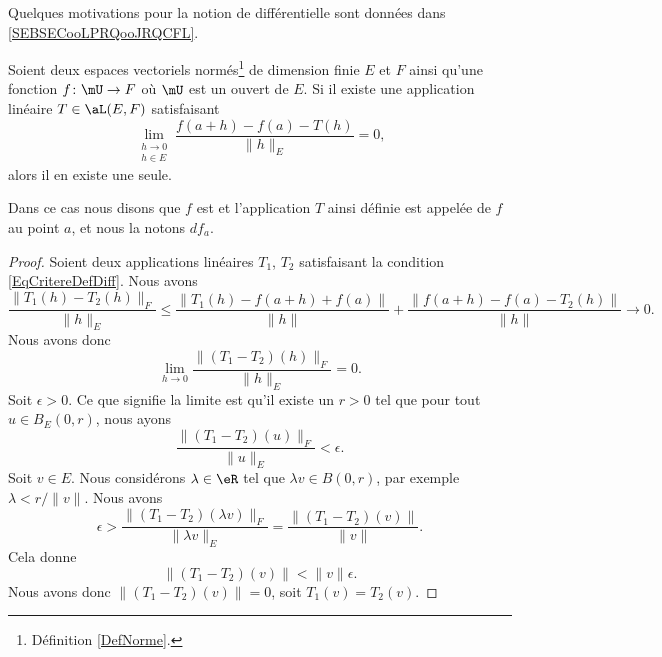 Quelques motivations pour la notion de différentielle sont données dans \ref{SEBSECooLPRQooJRQCFL}.

\begin{propositionDef}      \label{DefDifferentiellePta}
	Soient deux espaces vectoriels normés\footnote{Définition \ref{DefNorme}.} de dimension finie \( E\) et \( F\) ainsi qu'une fonction \( f\colon \mU\to F\) où \( \mU\) est un ouvert de \( E\). Si il existe une application linéaire \( T\in\aL(E,F)\) satisfaisant
	\begin{equation}	\label{EqCritereDefDiff}
		\lim_{\substack{h\to 0\\h\in E}}\frac{f(a+h)-f(a)-T(h)}{\|h\|_E}=0,
	\end{equation}
	alors il en existe une seule.

	Dans ce cas nous disons que \( f\) est  et l'application \( T\) ainsi définie est appelée  de \( f\) au point \( a\), et nous la notons \( df_a\).
\end{propositionDef}

\begin{proof}
	Soient deux applications linéaires \( T_1\), \( T_2\) satisfaisant la condition \eqref{EqCritereDefDiff}. Nous avons
	\begin{equation}
		\frac{ \| T_1(h)-T_2(h) \|_F }{ \| h \|_E }\leq \frac{ \| T_1(h)-f(a+h)+f(a) \| }{ \| h \| }+\frac{ \| f(a+h)-f(a)-T_2(h) \| }{ \| h \| }\to 0.
	\end{equation}
	Nous avons donc
	\begin{equation}
		\lim_{h\to 0} \frac{ \| (T_1-T_2)(h) \|_F }{ \| h \|_E }=0.
	\end{equation}
	Soit \( \epsilon>0\). Ce que signifie la limite est qu'il existe un \( r>0\) tel que pour tout \( u\in B_E(0,r)\), nous ayons
	\begin{equation}
		\frac{ \| (T_1-T_2)(u) \|_F }{ \| u \|_E }<\epsilon.
	\end{equation}
	Soit \( v\in E\). Nous considérons \( \lambda\in\eR\) tel que \( \lambda v\in B(0,r)\), par exemple \( \lambda<r/\| v \|\). Nous avons
	\begin{equation}
		\epsilon>\frac{ \| (T_1-T_2)(\lambda v) \|_F }{ \| \lambda v \|_E }=\frac{ \| (T_1-T_2)(v) \| }{ \| v \| }.
	\end{equation}
	Cela donne
	\begin{equation}
		\| (T_1-T_2)(v) \|<\| v \|\epsilon.
	\end{equation}
	Nous avons donc \( \| (T_1-T_2)(v) \|=0\), soit \( T_1(v)=T_2(v)\).
\end{proof}

